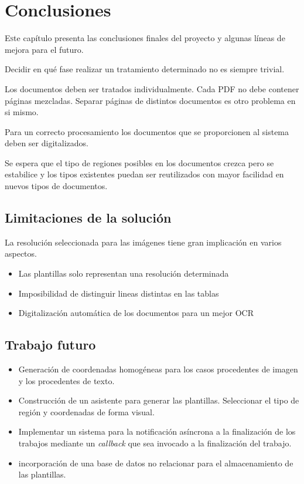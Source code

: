 
\chapter{Conclusiones}
\label{chap:conclusiones}

\lettrine{E}ste capítulo presenta las conclusiones finales del proyecto y algunas líneas de mejora para el futuro.

Decidir en qué fase realizar un tratamiento determinado no es siempre trivial.

Los documentos deben ser tratados individualmente. Cada PDF no debe contener páginas mezcladas. Separar páginas de distintos documentos es otro problema en si mismo.

Para un correcto procesamiento los documentos que se proporcionen 
al sistema deben ser digitalizados.

Se espera que el tipo de regiones posibles en los documentos crezca pero se estabilice y los tipos existentes puedan ser reutilizados con mayor facilidad en nuevos tipos de documentos.

\section{Limitaciones de la solución}
La resolución seleccionada para las imágenes tiene gran implicación en varios aspectos.
\begin{itemize}
    \item Las plantillas solo representan una resolución determinada
    \item Imposibilidad de distinguir lineas distintas en las tablas
    \item Digitalización automática de los documentos para un mejor OCR
\end{itemize}

\section{Trabajo futuro}

\begin{itemize}
    \item Generación de coordenadas homogéneas para los casos procedentes de imagen y los procedentes de texto.
    \item Construcción de un asistente para generar las plantillas. Seleccionar el tipo de región y coordenadas de forma visual.
    \item Implementar un sistema para la notificación asíncrona a la finalización de los trabajos mediante un \emph{callback} que sea invocado a la finalización del trabajo.
    \item incorporación de una base de datos no relacionar para el almacenamiento de las plantillas.
\end{itemize}


